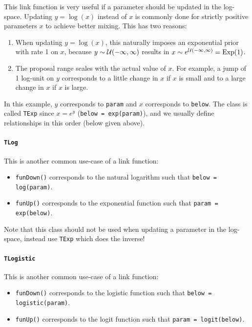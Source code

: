 \documentclass[a4paper,11pt]{article}
\newcommand{\class}[1]{\texttt{#1}}
\newcommand{\privfunc}[1]{\texttt{\textunderscore#1()}}
\begin{document}
This link function is very useful if a parameter should be updated in the log-space. Updating $y = \log(x)$ instead of $x$ is commonly done for strictly positive parameters $x$ to achieve better mixing. This has two reasons:
\begin{enumerate}
 \item When updating $y = \log(x)$, this naturally imposes an exponential prior with rate 1 on $x$, because $y \sim {\cal U}(-\infty, \infty)$ results in $x \sim e^{{\cal U}(-\infty, \infty)} = \text{Exp}(1)$.
 \item The proposal range scales with the actual value of $x$. For example, a jump of 1 log-unit on $y$ corresponds to a little change in $x$ if $x$ is small and to a large change in $x$ if $x$ is large.
\end{enumerate}
In this example, $y$ corresponds to \texttt{param} and $x$ corresponds to \texttt{below}. The class is called \class{TExp} since $x = e^y$ (\texttt{below = exp(param)}), and we usually define relationships in this order (below given above).

\paragraph{\class{TLog}}

This is another common use-case of a link function:

\begin{itemize}
 \item \privfunc{funDown} corresponds to the natural logarithm such that \texttt{below = log(param)}.
  \item \privfunc{funUp} corresponds to the exponential function such that \texttt{param = exp(below)}.
\end{itemize}

Note that this class should not be used when updating a parameter in the log-space, instead use \class{TExp} which does the inverse!

\paragraph{\class{TLogistic}}

This is another common use-case of a link function:

\begin{itemize}
 \item \privfunc{funDown} corresponds to the logistic function such that \texttt{below = logistic(param)}.
  \item \privfunc{funUp} corresponds to the logit function such that \texttt{param = logit(below)}.
\end{itemize}
\end{document}
